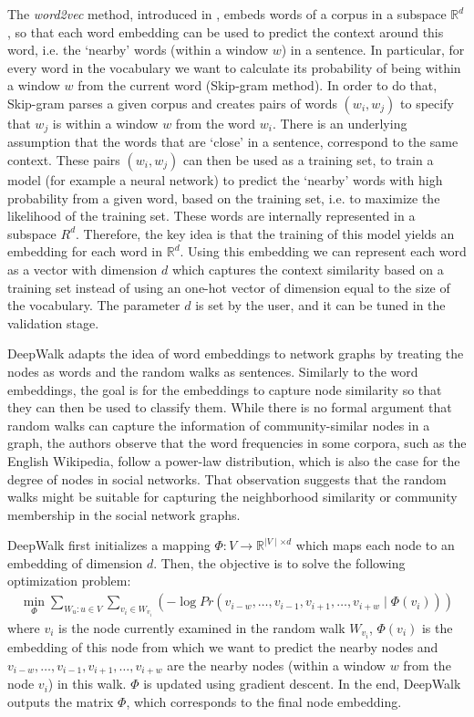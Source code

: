 The \emph{word2vec} method, introduced in \cite{mikolov2013efficient}, embeds
words of a corpus in a subspace $\mathbb{R}^d$, so that each word embedding can
be used to predict the context around this word, i.e. the `nearby' words (within
a window $w$) in a sentence. In particular, for every word in the vocabulary we
want to calculate its probability of being within a window $w$ from the current
word (Skip-gram method).
In order to do that, Skip-gram parses a given corpus and creates pairs of words
$(w_i, w_j)$ to specify that $w_j$ is within a window $w$ from the word $w_i$.
There is an underlying assumption that the words that are `close' in a
sentence, correspond to the same context. These pairs $(w_i, w_j)$ can then be
used as a training set, to train a model (for example a neural network) to
predict the `nearby' words with high probability from a given word, based on the
training set, i.e. to maximize the likelihood of the training set. These words
are internally represented in a subspace $R^d$. Therefore, the key idea is that
the training of this model yields an embedding for each word in $\mathbb{R}^d$.
Using this embedding we can represent each word as a vector with dimension $d$
which captures the context similarity based on a training set instead of using
an one-hot vector of dimension equal to the size of the vocabulary. The parameter
$d$ is set by the user, and it can be tuned in the validation stage.

DeepWalk adapts the idea of word embeddings to network graphs by treating the
nodes as words and the random walks as sentences. Similarly to the word
embeddings, the goal is for the embeddings to capture node similarity so that
they can then be used to classify them. While there is no formal argument that random walks can capture the information of community-similar nodes in a graph, the authors observe that the word frequencies in
some corpora, such as the English Wikipedia, follow a power-law distribution,
which is also the case for the degree of nodes in social networks. That
observation suggests that the random walks might be suitable for capturing the
neighborhood similarity or community membership in the social network graphs.

DeepWalk first initializes a mapping
$\Phi: V \to \mathbb{R}^{\mid V\mid \times d}$ which maps each node to an
embedding of dimension $d$. Then, the objective is to solve the following
optimization problem:
\begin{align}
    \min_{\Phi}
        \sum_{W_{u}: u \in V} \sum_{v_i \in W_{v_i}} \left (-\log{Pr({v_{i-w},
                \ldots, v_{i-1}, v_{i+1},
                \ldots , v_{i+w}} \mid \Phi(v_i))}
        \right )
\end{align}
where $v_i$ is the node currently examined in the random walk $W_{v_i}$,
$\Phi(v_i)$ is the embedding of this node from which we want to predict the
nearby nodes and $v_{i-w}, \ldots, v_{i-1}, v_{i+1}, \ldots, v_{i+w}$ are the
nearby nodes (within a window $w$ from the node $v_i$) in this walk.
$\Phi$ is updated using gradient descent. In the end, DeepWalk outputs the
matrix $\Phi$, which corresponds to the final node embedding.

